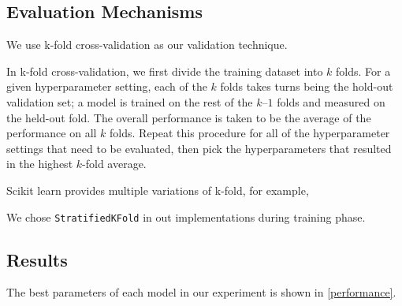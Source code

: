 \documentclass{standalone}
\begin{document}
{\subsection{Evaluation Mechanisms}


We use k-fold cross-validation as our validation technique.

In k-fold cross-validation, we first divide the training dataset into $k$ folds. For a given hyperparameter setting, each of the $k$ folds takes turns being the hold-out validation set; a model is trained on the rest of the $k – 1$ folds and measured on the held-out fold. The overall performance is taken to be the average of the performance on all $k$ folds. Repeat this procedure for all of the hyperparameter settings that need to be evaluated, then pick the hyperparameters that resulted in the highest $k$-fold average.

Scikit learn provides multiple variations of k-fold\cite{scikit-learn}, for example, 

We chose \verb|StratifiedKFold| in out implementations during training phase.

\subsection{Results}
The best parameters of each model in our experiment is shown in \cref{performance}.

}
\end{document}

